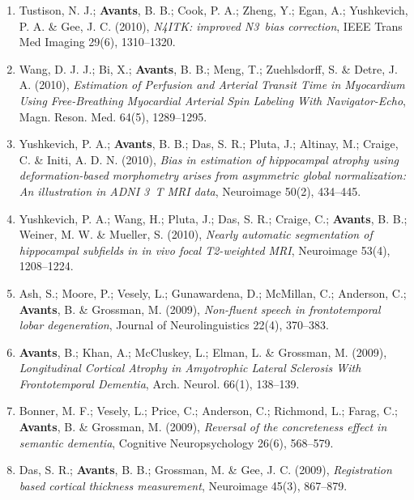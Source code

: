 \documentclass[11pt]{moderncv} %
\begin{document}
\begin{enumerate}
\item  Tustison, N. J.; \textbf{Avants}, B. B.; Cook, P. A.; Zheng, Y.; Egan, A.; Yushkevich, P. A. \&  Gee, J. C. (2010), \textit{N4ITK: improved N3~bias correction}, IEEE Trans Med Imaging 29(6), 1310--1320.

\item  Wang, D. J. J.; Bi, X.; \textbf{Avants}, B. B.; Meng, T.; Zuehlsdorff, S. \&  Detre, J. A. (2010), \textit{Estimation of Perfusion and Arterial Transit Time in Myocardium Using Free-Breathing Myocardial Arterial Spin Labeling With Navigator-Echo}, Magn. Reson. Med. 64(5), 1289--1295.

\item  Yushkevich, P. A.; \textbf{Avants}, B. B.; Das, S. R.; Pluta, J.; Altinay, M.; Craige, C. \&  Initi, A. D. N. (2010), \textit{Bias in estimation of hippocampal atrophy using deformation-based morphometry arises from asymmetric global normalization: An illustration in ADNI 3~T MRI data}, Neuroimage 50(2), 434--445.

\item  Yushkevich, P. A.; Wang, H.; Pluta, J.; Das, S. R.; Craige, C.; \textbf{Avants}, B. B.; Weiner, M. W. \&  Mueller, S. (2010), \textit{Nearly automatic segmentation of hippocampal subfields in in vivo focal T2-weighted MRI}, Neuroimage 53(4), 1208--1224.

\item  Ash, S.; Moore, P.; Vesely, L.; Gunawardena, D.; McMillan, C.; Anderson, C.; \textbf{Avants}, B. \&  Grossman, M. (2009), \textit{Non-fluent speech in frontotemporal lobar degeneration}, Journal of Neurolinguistics 22(4), 370--383.

\item  \textbf{Avants}, B.; Khan, A.; McCluskey, L.; Elman, L. \&  Grossman, M. (2009), \textit{Longitudinal Cortical Atrophy in Amyotrophic Lateral Sclerosis With Frontotemporal Dementia}, Arch. Neurol. 66(1), 138--139.

\item  Bonner, M. F.; Vesely, L.; Price, C.; Anderson, C.; Richmond, L.; Farag, C.; \textbf{Avants}, B. \&  Grossman, M. (2009), \textit{Reversal of the concreteness effect in semantic dementia}, Cognitive Neuropsychology 26(6), 568--579.

\item  Das, S. R.; \textbf{Avants}, B. B.; Grossman, M. \&  Gee, J. C. (2009), \textit{Registration based cortical thickness measurement}, Neuroimage 45(3), 867--879.


\end{enumerate}
\end{document}
